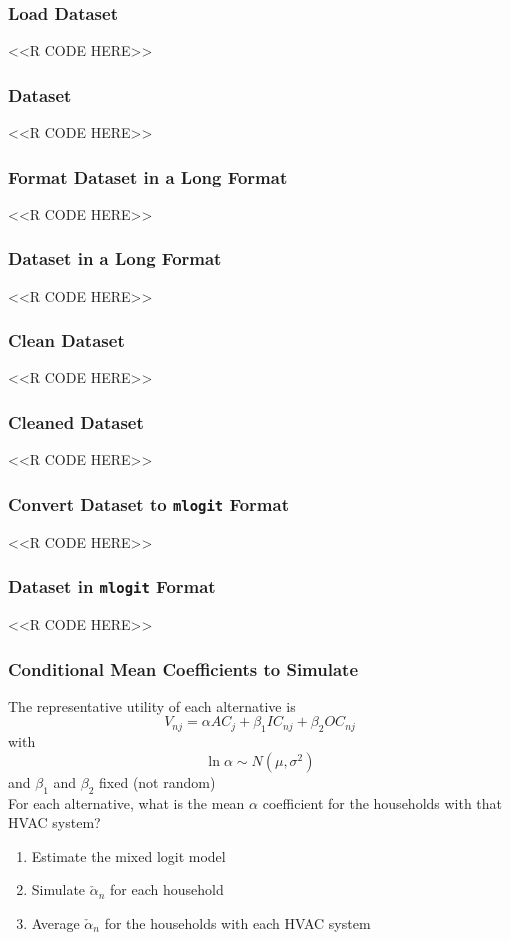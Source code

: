 \documentclass{beamer}
\begin{document}
\begin{frame}[fragile]\frametitle{Load Dataset}
    <<R CODE HERE>>
\end{frame}

\begin{frame}[fragile]\frametitle{Dataset}
    <<R CODE HERE>>
\end{frame}

\begin{frame}[fragile]\frametitle{Format Dataset in a Long Format}
    <<R CODE HERE>>
\end{frame}

\begin{frame}[fragile]\frametitle{Dataset in a Long Format}
    <<R CODE HERE>>
\end{frame}

\begin{frame}[fragile]\frametitle{Clean Dataset}
    <<R CODE HERE>>
\end{frame}

\begin{frame}[fragile]\frametitle{Cleaned Dataset}
    <<R CODE HERE>>
\end{frame}

\begin{frame}[fragile]\frametitle{Convert Dataset to \texttt{mlogit} Format}
    <<R CODE HERE>>
\end{frame}

\begin{frame}[fragile]\frametitle{Dataset in \texttt{mlogit} Format}
    <<R CODE HERE>>
\end{frame}

\begin{frame}\frametitle{Conditional Mean Coefficients to Simulate}
    The representative utility of each alternative is
    $$V_{nj} = \alpha AC_j + \beta_1 IC_{nj} + \beta_2 OC_{nj}$$
    with
    $$\ln \alpha \sim N(\mu, \sigma^2)$$
    and $\beta_1$ and $\beta_2$ fixed (not random) \\
    \vspace{3ex}
    For each alternative, what is the mean $\alpha$ coefficient for the households with that HVAC system?
    \begin{enumerate}
        \item Estimate the mixed logit model
        \item Simulate $\check{\alpha}_n$ for each household
        \item Average $\check{\alpha}_n$ for the households with each HVAC system
    \end{enumerate}
\end{frame}
\end{document}
